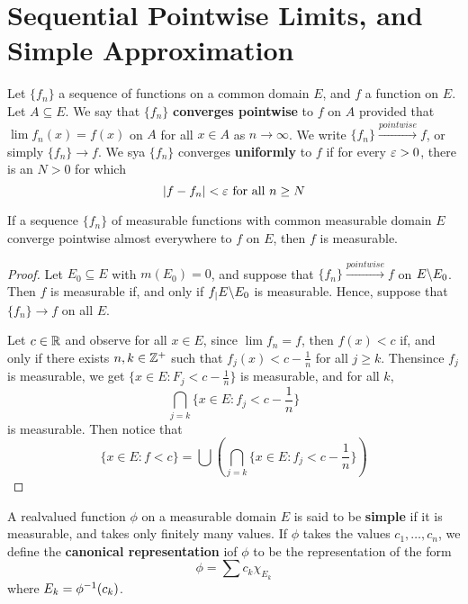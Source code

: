 \section{Sequential Pointwise Limits, and Simple Approximation}

\begin{definition}
    Let $\{f_n\}$ a sequence of functions on a common domain $E$, and  $f$ a
    function on $E$. Let $A \subseteq E$. We say that  $\{f_n\}$
    \textbf{converges pointwise} to $f$ on  $A$ provided that
    $\lim{f_n(x)}=f(x)$ on $A$ for all $x \in A$ as $n \xrightarrow{} \infty$.
    We write $\{f_n\} \xrightarrow{pointwise} f$, or simply $\{f_n\}
    \xrightarrow{} f$. We sya $\{f_n\}$ converges \textbf{uniformly} to $f$ if
    for every  $\varepsilon>0$, there is an  $N>0$ for which
    \begin{equation*}
        |f-f_n|<\varepsilon \text{ for all } n \geq N
    \end{equation*}
\end{definition}

\begin{lemma}\label{3.2.1}
    If a sequence $\{f_n\}$ of measurable functions with common measurable
    domain $E$ converge pointwise almost everywhere to  $f$ on  $E$, then  $f$
    is measurable.
\end{lemma}
\begin{proof}
    Let $E_0 \subseteq E$ with $m(E_0)=0$, and suppose that $\{f_n\}
    \xrightarrow{pointwise} f$ on $E\backslash E_0$. Then $f$ is measurable if, and
    only if $f_|{E\backslash E_0}$ is measurable. Hence, suppose that $\{f_n\}
     \xrightarrow{} f$ on all $E$.

     Let $c \in \mathbb{R}$ and observe for all  $x \in E$, since  $\lim{f_n}=f$, then
     $f(x)<c$ if, and only if there exists $n,k \in \mathbb{Z}^+$ such that
     $f_j(x)<c-\frac{1}{n}$ for all $j \geq k$. Thensince  $f_j$ is measurable,
     we get  $\{x \in E : F_j<c-\frac{1}{n}\}$ is measurable, and for all $k$,
     \begin{equation*}
         \bigcap_{j=k}{\{x \in E : f_j<c-\frac{1}{n}\}}
     \end{equation*}
     is measurable. Then notice that
     \begin{equation*}
     \{x \in E : f<c\}=\bigcup{(\bigcap_{j=k}{\{x \in E : f_j<c-\frac{1}{n}}\})}
     \end{equation*}
\end{proof}

\begin{definition}
    A realvalued function $\phi$ on a measurable domain  $E$ is said to be
    \textbf{simple} if it is measurable, and takes only finitely many values. If
    $\phi$ takes the values  $c_1 ,\dots, c_n$, we define the \textbf{canonical
    representation} iof $\phi$ to be the representation of the form
    \begin{equation*}
        \phi=\sum{c_k\chi_{E_k}}
    \end{equation*}
    where $E_k=\phi^{-1}(c_k)$.
\end{definition}

